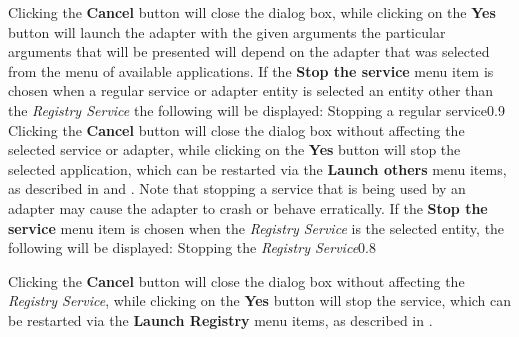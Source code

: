 Clicking the \textbf{Cancel} button will close the dialog box, while clicking on the
\textbf{Yes} button will launch the adapter with the given arguments \longDash{} the
particular arguments that will be presented will depend on the adapter that was selected
from the menu of available applications.
\secondaryEnd{}
If the \textbf{Stop the service} menu item is chosen when a regular service or adapter
entity is selected \longDash{} an entity other than the \emph{Registry Service}
\longDash{} the following will be displayed:
%
{Stopping a regular service}{0.9}
\clearpage
Clicking the \textbf{Cancel} button will close the dialog box without affecting the
selected service or adapter, while clicking on the \textbf{Yes} button will stop the
selected application, which can be restarted via the \textbf{Launch others \textellipsis}
menu items, as described in
 and
.
Note that stopping a service that is being used by an adapter may cause the adapter to
crash or behave erratically.
\secondaryEnd{}
If the \textbf{Stop the service} menu item is chosen when the \emph{Registry Service} is
the selected entity, the following will be displayed:
%
{Stopping the \emph{Registry Service}}{0.8}

Clicking the \textbf{Cancel} button will close the dialog box without affecting the
\emph{Registry Service}, while clicking on the \textbf{Yes} button will stop the service,
which can be restarted via the \textbf{Launch Registry} menu items, as described in
.
\secondaryEnd{}
\primaryEnd{}